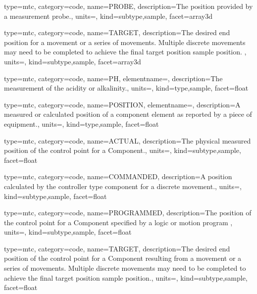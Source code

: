 {
  type=mtc,
  category=code,
  name={PROBE},
  description={The position provided by a measurement probe.},
  units=,
  kind={subtype,sample},
  facet={\gls{array3d}}
}


{
  type=mtc,
  category=code,
  name={TARGET},
  description={The desired end position for a movement or a series of movements. Multiple discrete movements may need to be completed to achieve the final \gls{target position sample} position.  },
  units=,
  kind={subtype,sample},
  facet={\gls{array3d}}
}


{
  type=mtc,
  category=code,
  name={PH},
  elementname=,
  description={The measurement of the acidity or alkalinity.},
  units=,
  kind={type,sample},
  facet={\gls{float}}
}


{
  type=mtc,
  category=code,
  name={POSITION},
  elementname=,
  description={A measured or calculated position of a \gls{component} element as reported by a piece of equipment.},
  units=,
  kind={type,sample},
  facet={\gls{float}}
}


{
  type=mtc,
  category=code,
  name={ACTUAL},
  description={The physical measured position of the control point for a Component.},
  units=,
  kind={subtype,sample},
  facet={\gls{float}}
}


{
  type=mtc,
  category=code,
  name={COMMANDED},
  description={A position calculated by the \gls{controller} type component for a discrete movement.},
  units=,
  kind={subtype,sample},
  facet={\gls{float}}
}


{
  type=mtc,
  category=code,
  name={PROGRAMMED},
  description={The position of the control point for a Component specified by a logic or motion program },
  units=,
  kind={subtype,sample},
  facet={\gls{float}}
}


{
  type=mtc,
  category=code,
  name={TARGET},
  description={The desired end position of the control point for a Component resulting from a movement or a series of movements.  Multiple discrete movements may need to be completed to achieve the final \gls{target position sample} position.},
  units=,
  kind={subtype,sample},
  facet={\gls{float}}
}


